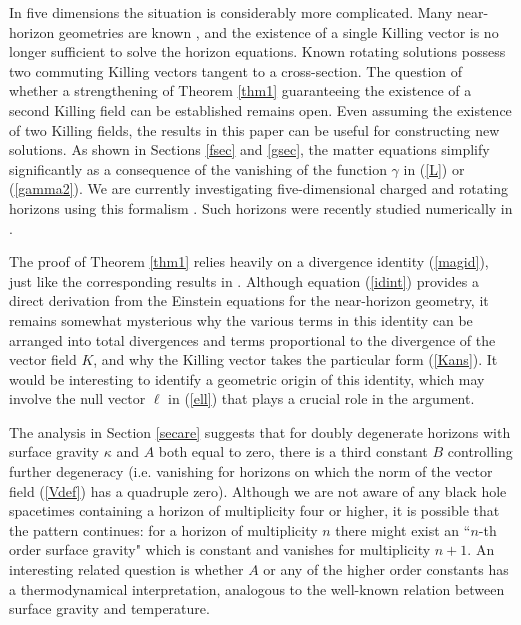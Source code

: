 \documentclass[11pt, reqno]{amsart}
\theoremstyle{plain}
\theoremstyle{definition}
\numberwithin{equation}{section}
\begin{document}
In five dimensions the situation is considerably more complicated. Many near-horizon geometries are known \cite{KL13}, and the existence of a single Killing vector is no longer sufficient to solve the horizon equations. Known rotating solutions possess two commuting Killing vectors tangent to a cross-section. The question of whether a strengthening of Theorem \ref{thm1} guaranteeing the existence of a second Killing field can be established remains open. Even assuming the existence of two Killing fields, the results in this paper can be useful for constructing new solutions. As shown in Sections \ref{fsec} and \ref{gsec}, the matter equations simplify significantly as a consequence of the vanishing of the function $\gamma$ in (\ref{L}) or (\ref{gamma2}). We are currently investigating five-dimensional charged and rotating horizons using this formalism \cite{CL25}. Such horizons were recently studied numerically in \cite{HS24}.

The proof of Theorem \ref{thm1} relies heavily on a divergence identity (\ref{magid}), just like the corresponding results in \cite{DL,CKL,CD25}. Although equation (\ref{idint}) provides a direct derivation from the Einstein equations for the near-horizon geometry, it remains somewhat mysterious why the various terms in this identity can be arranged into total divergences and terms proportional to the divergence of the vector field $K$, and why the Killing vector takes the particular form (\ref{Kans}). It would be interesting to identify a geometric origin of this identity, which may involve the null vector $\ell$ in (\ref{ell}) that plays a crucial role in the argument.

The analysis in Section \ref{secare} suggests that for doubly degenerate horizons with surface gravity $\kappa$ and $A$ both equal to zero, there is a third constant $B$ controlling further degeneracy (i.e. vanishing for horizons on which the norm of the vector field (\ref{Vdef}) has a quadruple zero). Although we are not aware of any black hole spacetimes containing a horizon of multiplicity four or higher, it is possible that the pattern continues: for a horizon of multiplicity $n$ there might exist an ``$n$-th order surface gravity" which is constant and vanishes for multiplicity $n+1$. An interesting related question is whether $A$ or any of the higher order constants has a thermodynamical interpretation, analogous to the well-known relation between surface gravity and temperature.
\end{document}
